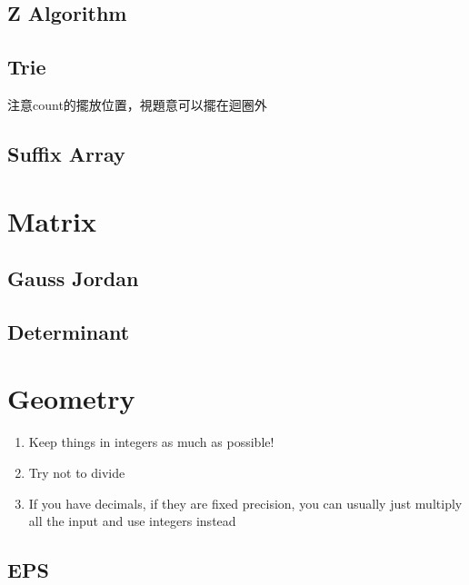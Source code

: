 \documentclass[10pt,oneside]{article}
\begin{document}
\begin{landscape}
\begin{multicols}{2}


\subsection{Z Algorithm}



\subsection{Trie}
注意count的擺放位置，視題意可以擺在迴圈外


\subsection{Suffix Array}

\section{Matrix}

\subsection{Gauss Jordan}


\subsection{Determinant}




\section{Geometry}

\begin{enumerate}
	\item Keep things in integers as much as possible!
	\item Try not to divide
	\item If you have decimals, if they are fixed precision, you can usually just multiply all the input and use integers instead
\end{enumerate}

\subsection{EPS}


\end{multicols}
\end{landscape}
\end{document}
